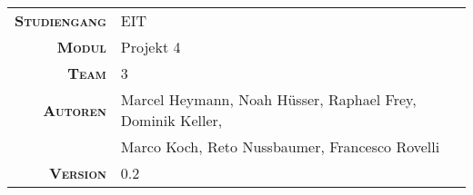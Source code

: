 \begin{titlepage}

    \maketitle

    \vspace{50mm}

    \begin{tabular}{r|l}

        \textsc{\textbf{Studiengang}}
        & EIT\\
        [4mm]

        \textsc{\textbf{Modul}}
        & Projekt 4 \\
        [4mm]

        \textsc{\textbf{Team}}
        & 3 \\
        [4mm]

        \textsc{\textbf{Autoren}}
        & Marcel Heymann, Noah H\"usser, Raphael Frey, Dominik Keller,  \\
        & Marco Koch, Reto Nussbaumer, Francesco Rovelli                \\
        [4mm]

        \textsc{\textbf{Version}}
        & 0.2 \\
    \end{tabular}

\end{titlepage}
